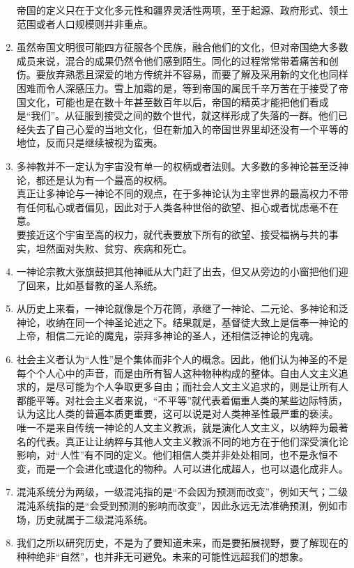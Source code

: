\documentclass[UTF8]{ctexart}
\begin{document}
\begin{enumerate}
			帝国的定义只在于文化多元性和疆界灵活性两项，至于起源、政府形式、领土范围或者人口规模则并非重点。
			\item 虽然帝国文明很可能四方征服各个民族，融合他们的文化，但对帝国绝大多数成员来说，混合的成果仍然令他们感到陌生。同化的过程常常带着痛苦和创伤。要放弃熟悉且深爱的地方传统并不容易，而要了解及采用新的文化也同样困难而令人深感压力。雪上加霜的是，等到帝国的属民千辛万苦在于接受了帝国文化，可能也是在数十年甚至数百年以后，帝国的精英才能把他们看成是“我们”。从征服到接受之间的数个世代，就这样形成了失落的一群。他们已经失去了自己心爱的当地文化，但在新加入的帝国世界里却还没有一个平等的地位，反而只是继续被视为蛮夷。
			\item 多神教并不一定认为宇宙没有单一的权柄或者法则。大多数的多神论甚至泛神论，都还是认为有一个最高的权柄。\\
			真正让多神论与一神论不同的观点，在于多神论认为主宰世界的最高权力不带有任何私心或者偏见，因此对于人类各种世俗的欲望、担心或者忧虑毫不在意。\\
			要接近这个宇宙至高的权力，就代表要放下所有的欲望、接受福祸与共的事实，坦然面对失败、贫穷、疾病和死亡。
			\item 一神论宗教大张旗鼓把其他神祗从大门赶了出去，但又从旁边的小窗把他们迎了回来，比如基督教的圣人系统。
			\item 从历史上来看，一神论就像是个万花筒，承继了一神论、二元论、多神论和泛神论，收纳在同一个神圣论述之下。结果就是，基督徒大致上是信奉一神论的上帝，相信二元论的魔鬼，崇拜多神论的圣人，还相信泛神论的鬼魂。
			\item 社会主义者认为“人性”是个集体而非个人的概念。因此，他们认为神圣的不是每个个人心中的声音，而是由所有智人这种物种构成的整体。自由人文主义追求的，是尽可能为个人争取更多自由；而社会人文主义追求的，则是让所有人都能平等。对社会主义者来说，“不平等”就代表着偏重人类的某些边际特质，认为这比人类的普遍本质更重要，这可以说是对人类神圣性最严重的亵渎。\\
			唯一不是来自传统一神论的人文主义教派，就是演化人文主义，以纳粹为最著名的代表。真正让让纳粹与其他人文主义教派不同的地方在于他们深受演化论影响，对“人性”有不同的定义。他们相信人类并非处处相同，也不是永恒不变，而是一个会进化或退化的物种。人可以进化成超人，也可以退化成非人。
			\item 混沌系统分为两级，一级混沌指的是“不会因为预测而改变”，例如天气；二级混沌系统指的是“会受到预测的影响而改变”，因此永远无法准确预测，例如市场，历史就属于二级混沌系统。
			\item 我们之所以研究历史，不是为了要知道未来，而是要拓展视野，要了解现在的种种绝非“自然”，也并非无可避免。未来的可能性远超我们的想象。

\end{enumerate}
\end{document}
